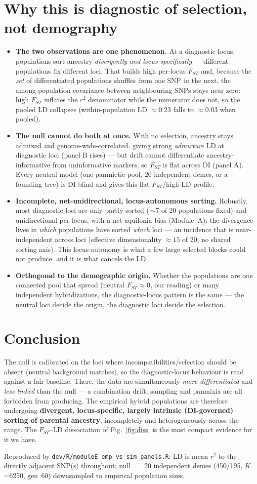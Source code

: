 \documentclass[11pt,a4paper]{article}
\begin{document}
\section*{Why this is diagnostic of selection, not demography}
\begin{itemize}\itemsep2pt
\item \textbf{The two observations are one phenomenon.} At a diagnostic locus,
populations sort ancestry \emph{divergently and locus-specifically} --- different
populations fix different loci. That builds high per-locus $F_{ST}$ and, because the
\emph{set} of differentiated populations shuffles from one SNP to the next, the
among-population covariance between neighbouring SNPs stays near zero: high $F_{ST}$
inflates the $r^2$ denominator while the numerator does not, so the pooled LD
collapses (within-population LD $\approx0.23$ falls to $\approx0.03$ when pooled).
\item \textbf{The null cannot do both at once.} With no selection, ancestry stays
admixed and genome-wide-correlated, giving strong \emph{admixture} LD at diagnostic
loci (panel B rises) --- but drift cannot differentiate ancestry-informative from
uninformative markers, so $F_{ST}$ is flat across DI (panel A). Every neutral model
(one panmictic pool, 20 independent demes, or a founding tree) is DI-blind and gives
this flat-$F_{ST}$/high-LD profile.
\item \textbf{Incomplete, net-unidirectional, locus-autonomous sorting.} Robustly,
most diagnostic loci are only partly sorted (\,$\sim$7 of 20 populations fixed) and
unidirectional per locus, with a net aquilonia bias (Module~A); the divergence lives
in \emph{which} populations have sorted \emph{which} loci --- an incidence that is
near-independent across loci (effective dimensionality $\approx15$ of 20; no shared
sorting axis). This locus-autonomy is what a few large selected blocks could not
produce, and it is what cancels the LD.
\item \textbf{Orthogonal to the demographic origin.} Whether the populations are one
connected pool that spread (neutral $F_{ST}\approx0$, our reading) or many
independent hybridizations, the diagnostic-locus pattern is the same --- the neutral
loci decide the origin, the diagnostic loci decide the selection.
\end{itemize}

\section*{Conclusion}
The null is calibrated on the loci where incompatibilities/selection should be absent
(neutral background matches), so the diagnostic-locus behaviour is read against a fair
baseline. There, the data are simultaneously \emph{more differentiated} and \emph{less
linked} than the null --- a combination drift, sampling and panmixia are all forbidden
from producing. The empirical hybrid populations are therefore undergoing
\textbf{divergent, locus-specific, largely intrinsic (DI-governed) sorting of parental
ancestry}, incompletely and heterogeneously across the range. The $F_{ST}$--LD
dissociation of Fig.~\ref{fig:diss} is the most compact evidence for it we have.

\vspace{0.5em}\noindent\footnotesize
Reproduced by \texttt{dev/R/moduleE\_emp\_vs\_sim\_panels.R}; LD is mean $r^2$ to the
directly adjacent SNP(s) throughout; null $=$ 20 independent demes (450/195, $K$=6250,
gen~60) downsampled to empirical population sizes.
\end{document}
